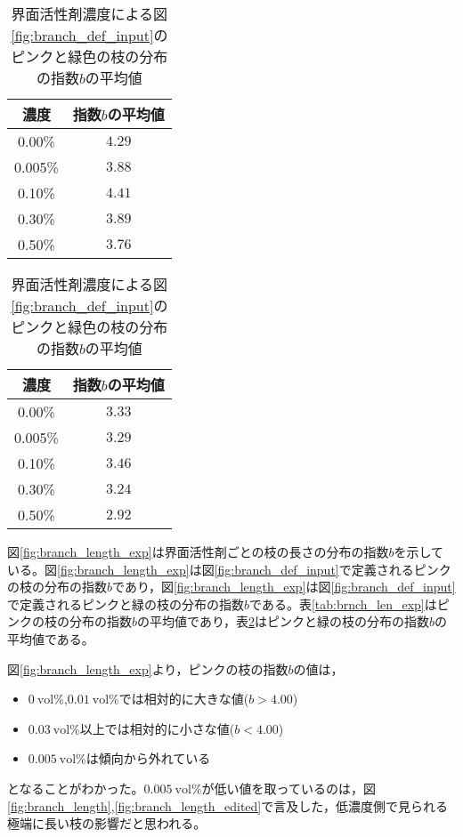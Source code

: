 \documentclass[autodetect-engine,dvi=dvipdfmx,a4paper,ja=standard,oneside,openany,11pt]{bxjsbook}
\begin{document}
\begin{table}[htbp]
  \begin{minipage}{0.45\textwidth}
    \centering
    \caption{界面活性剤濃度による図\ref{fig:branch_def_input}のピンク色の枝の分布の指数$b$の平均値}
    \begin{tabular}{|c|c|}
      \hline
      濃度      & 指数$b$の平均値 \\ \hline\hline
      0.00\%  & $4.29$    \\ \hline
      0.005\% & $3.88$    \\ \hline
      0.10\%  & $4.41$    \\ \hline
      0.30\%  & $3.89$    \\ \hline
      0.50\%  & $3.76$    \\
      \hline
    \end{tabular}
    \label{tab:brnch_len_exp}
  \end{minipage}
  \hfill
  \begin{minipage}{0.45\textwidth}
    \centering
    \caption{界面活性剤濃度による図\ref{fig:branch_def_input}のピンクと緑色の枝の分布の指数$b$の平均値}
    \begin{tabular}{|c|c|}
      \hline
      濃度      & 指数$b$の平均値 \\ \hline\hline
      0.00\%  & $3.33$    \\ \hline
      0.005\% & $3.29$    \\ \hline
      0.10\%  & $3.46$    \\ \hline
      0.30\%  & $3.24$    \\ \hline
      0.50\%  & $2.92$    \\
      \hline
    \end{tabular}
    \label{tab:branch_len_exp_edited}
  \end{minipage}
\end{table}

図\ref{fig:branch_length_exp}は界面活性剤ごとの枝の長さの分布の指数$b$を示している。図\ref{fig:branch_length_exp}は図\ref{fig:branch_def_input}で定義されるピンクの枝の分布の指数$b$であり，図\ref{fig:branch_length_exp}は図\ref{fig:branch_def_input}で定義されるピンクと緑の枝の分布の指数$b$である。表\ref{tab:brnch_len_exp}はピンクの枝の分布の指数$b$の平均値であり，表\ref{tab:branch_len_exp_edited}はピンクと緑の枝の分布の指数$b$の平均値である。

図\ref{fig:branch_length_exp}より，ピンクの枝の指数$b$の値は，
\begin{itemize}
  \item $\SI{0}{\mathrm{vol}\%}$,$\SI{0.01}{\mathrm{vol}\%}$では相対的に大きな値($b>4.00$)
  \item $\SI{0.03}{\mathrm{vol}\%}$以上では相対的に小さな値($b<4.00$)
  \item $\SI{0.005}{\mathrm{vol}\%}$は傾向から外れている
\end{itemize}
となることがわかった。$\SI{0.005}{\mathrm{vol}\%}$が低い値を取っているのは，図\ref{fig:branch_length},\ref{fig:branch_length_edited}で言及した，低濃度側で見られる極端に長い枝の影響だと思われる。
\end{document}
